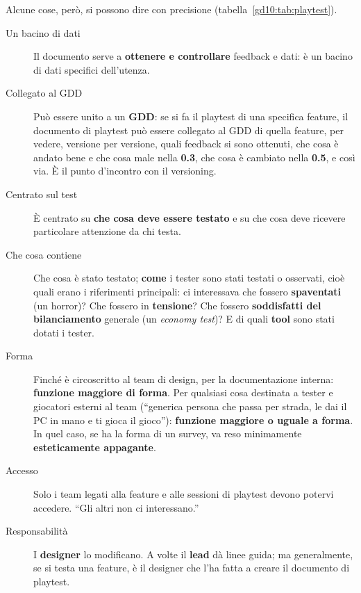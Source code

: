 Alcune cose, però, si possono dire con precisione
(tabella~\ref{gd10:tab:playtest}).

\begin{description}
  \item[Un bacino di dati] Il documento serve a \textbf{ottenere e
        controllare} feedback e dati: è un bacino di dati specifici
        dell'utenza.
  \item[Collegato al GDD] Può essere unito a un \textbf{GDD}: se si fa il
        playtest di una specifica feature, il documento di playtest può
        essere collegato al GDD di quella feature, per vedere, versione per
        versione, quali feedback si sono ottenuti, che cosa è andato bene e
        che cosa male nella \textbf{0.3}, che cosa è cambiato nella
        \textbf{0.5}, e così via. È il punto d'incontro con il versioning.
  \item[Centrato sul test] È centrato su \textbf{che cosa deve essere
        testato} e su che cosa deve ricevere particolare attenzione da chi
        testa.
  \item[Che cosa contiene] Che cosa è stato testato; \textbf{come} i tester
        sono stati testati o osservati, cioè quali erano i riferimenti
        principali: ci interessava che fossero \textbf{spaventati} (un
        horror)? Che fossero in \textbf{tensione}? Che fossero
        \textbf{soddisfatti del bilanciamento} generale (un \emph{economy
        test})? E di quali \textbf{tool} sono stati dotati i tester.
  \item[Forma] Finché è circoscritto al team di design, per la
        documentazione interna: \textbf{funzione maggiore di forma}. Per
        qualsiasi cosa destinata a tester e giocatori esterni al team
        (``generica persona che passa per strada, le dai il PC in mano e ti
        gioca il gioco''): \textbf{funzione maggiore o uguale a forma}. In
        quel caso, se ha la forma di un survey, va reso minimamente
        \textbf{esteticamente appagante}.
  \item[Accesso] Solo i team legati alla feature e alle sessioni di
        playtest devono potervi accedere. ``Gli altri non ci interessano.''
  \item[Responsabilità] I \textbf{designer} lo modificano. A volte il
        \textbf{lead} dà linee guida; ma generalmente, se si testa una
        feature, è il designer che l'ha fatta a creare il documento di
        playtest.
\end{description}

